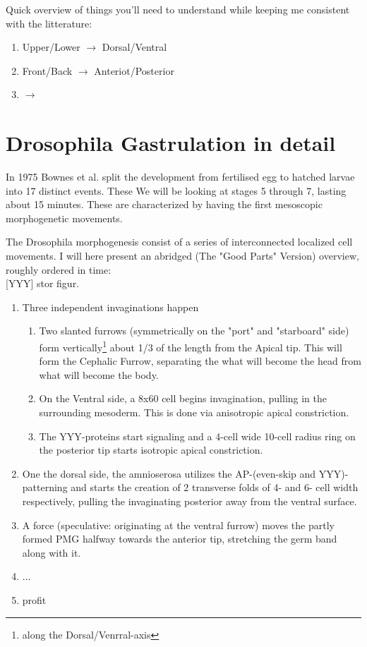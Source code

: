 Quick overview of things you'll need to understand while keeping me consistent with the litterature:

\begin{enumerate}
    \item Upper/Lower $\rightarrow$ Dorsal/Ventral
    \item Front/Back  $\rightarrow$ Anteriot/Posterior
    \item   $\rightarrow$
\end{enumerate}
\section{Drosophila Gastrulation in detail}
In 1975 Bownes et al. split the development from  fertilised egg to hatched larvae into 17 distinct events. \cite{bownes1975photographic} These
We will be looking at stages 5 through 7, lasting about 15 minutes. These are characterized by having the first mesoscopic morphogenetic movements.

The Drosophila morphogenesis consist of a series of interconnected localized cell movements. I will here present an abridged (The "Good Parts" Version) overview, roughly ordered in time:\\

[YYY] stor figur.\\

\begin{enumerate}
    \item Three independent invaginations happen
    \begin{enumerate}
        \item Two slanted furrows (symmetrically on the "port" and "starboard" side) form vertically\footnote{along the Dorsal/Venrral-axis} about 1/3 of the length from the Apical tip\cite{}. This will form the Cephalic Furrow, separating the what will become the head from what will become the body. 
        \item  On the Ventral side, a 8x60 cell\cite{} begins invagination, pulling in the surrounding mesoderm. This is done via anisotropic\cite{} apical constriction\cite{}.
        \item The YYY-proteins start signaling\cite{} and a 4-cell wide 10-cell radius\cite{} ring on the posterior tip starts isotropic apical constriction\cite{}.
    \end{enumerate}
    \item One the dorsal side, the amnioserosa utilizes the AP-(even-skip and YYY)-patterning\cite{} and starts the creation of 2 transverse folds of 4- and 6- cell width respectively, pulling the invaginating posterior away from the ventral surface.
    \item  A force (speculative: originating at the ventral furrow) moves the partly formed PMG halfway towards the anterior tip, stretching the germ band along with it.
    \item ...
    \item profit
\end{enumerate}

